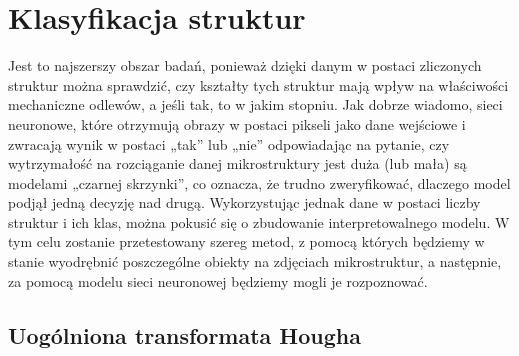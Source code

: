 \section{Klasyfikacja struktur}
\label{sec:klasyfikacja_struktur}

Jest to najszerszy obszar badań, ponieważ dzięki danym w postaci zliczonych struktur można sprawdzić, czy kształty tych struktur mają wpływ na właściwości mechaniczne odlewów, a jeśli tak, to w jakim stopniu. Jak dobrze wiadomo, sieci neuronowe, które otrzymują obrazy w postaci pikseli jako dane wejściowe i zwracają wynik w postaci „tak” lub „nie” odpowiadając na pytanie, czy wytrzymałość na rozciąganie danej mikrostruktury jest duża (lub mała) są modelami „czarnej skrzynki”, co oznacza, że trudno zweryfikować, dlaczego model podjął jedną decyzję nad drugą. Wykorzystując jednak dane w postaci liczby struktur i ich klas, można pokusić się o zbudowanie interpretowalnego modelu. W tym celu zostanie przetestowany szereg metod, z pomocą których będziemy w stanie wyodrębnić poszczególne obiekty na zdjęciach mikrostruktur, a następnie, za pomocą modelu sieci neuronowej będziemy mogli je rozpoznować. 

\subsection{Uogólniona transformata Hougha}
\label{hough}


